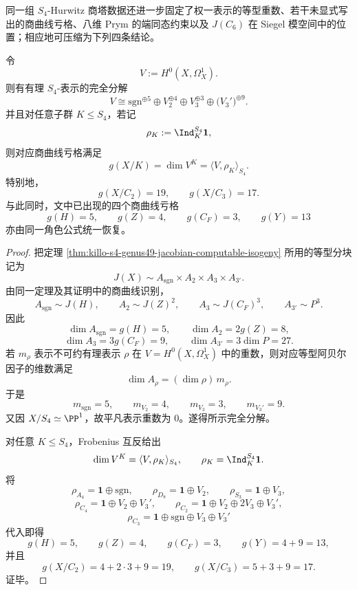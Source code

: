 同一组 \(S_4\)-Hurwitz 商塔数据还进一步固定了权一表示的等型重数、若干未显式写出的商曲线亏格、八维 Prym 的端同态约束以及 \(J(C_6)\) 在 Siegel 模空间中的位置；相应地可压缩为下列四条结论。

\begin{conclusion}\label{con:xi-time-part9n-s4-hodge-quotient-genera-recovery}
令
\[
V:=H^0(X,\Omega_X^1).
\]
则有有理 \(S_4\)-表示的完全分解
\[
\boxed{\;
V\cong
\mathrm{sgn}^{\oplus 5}\oplus
V_2^{\oplus 4}\oplus
V_3^{\oplus 3}\oplus
\bigl(V_3'\bigr)^{\oplus 9}.\;}
\]
并且对任意子群 \(K\le S_4\)，若记
\[
\rho_K:=\Ind_K^{S_4}\mathbf 1,
\]
则对应商曲线亏格满足
\[
g(X/K)=\dim V^K=\langle V,\rho_K\rangle_{S_4}.
\]
特别地，
\[
\boxed{\;
g(X/C_2)=19,\qquad g(X/C_3)=17.\;}
\]
与此同时，文中已出现的四个商曲线亏格
\[
g(H)=5,\qquad g(Z)=4,\qquad g(C_F)=3,\qquad g(Y)=13
\]
亦由同一角色公式统一恢复。
\end{conclusion}
\begin{proof}
把定理 \ref{thm:killo-s4-genus49-jacobian-computable-isogeny} 所用的等型分块记为
\[
J(X)\sim A_{\mathrm{sgn}}\times A_2\times A_3\times A_{3'}.
\]
由同一定理及其证明中的商曲线识别，
\[
A_{\mathrm{sgn}}\sim J(H),\qquad
A_2\sim J(Z)^2,\qquad
A_3\sim J(C_F)^3,\qquad
A_{3'}\sim P^3.
\]
因此
\[
\dim A_{\mathrm{sgn}}=g(H)=5,\qquad
\dim A_2=2g(Z)=8,
\]
\[
\dim A_3=3g(C_F)=9,\qquad
\dim A_{3'}=3\dim P=27.
\]
若 \(m_\rho\) 表示不可约有理表示 \(\rho\) 在 \(V=H^0(X,\Omega_X^1)\) 中的重数，则对应等型阿贝尔因子的维数满足
\[
\dim A_\rho=(\dim \rho)\,m_\rho.
\]
于是
\[
m_{\mathrm{sgn}}=5,\qquad
m_{V_2}=4,\qquad
m_{V_3}=3,\qquad
m_{V_3'}=9.
\]
又因 \(X/S_4\simeq \PP^1\)，故平凡表示重数为 \(0\)。遂得所示完全分解。

对任意 \(K\le S_4\)，Frobenius 互反给出
\[
\dim V^K=\langle V,\rho_K\rangle_{S_4},
\qquad
\rho_K=\Ind_K^{S_4}\mathbf 1.
\]
将
\[
\rho_{A_4}=\mathbf 1\oplus \mathrm{sgn},\qquad
\rho_{D_8}=\mathbf 1\oplus V_2,\qquad
\rho_{S_3}=\mathbf 1\oplus V_3,
\]
\[
\rho_{C_4}=\mathbf 1\oplus V_2\oplus V_3',\qquad
\rho_{C_2}=\mathbf 1\oplus V_2\oplus 2V_3\oplus V_3',
\]
\[
\rho_{C_3}=\mathbf 1\oplus \mathrm{sgn}\oplus V_3\oplus V_3'
\]
代入即得
\[
g(H)=5,\qquad g(Z)=4,\qquad g(C_F)=3,\qquad g(Y)=4+9=13,
\]
并且
\[
g(X/C_2)=4+2\cdot 3+9=19,
\qquad
g(X/C_3)=5+3+9=17.
\]
证毕。
\end{proof}

